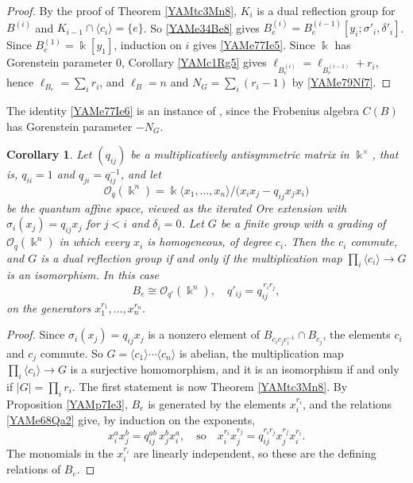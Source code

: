 \documentclass[reqno]{amsart}
\numberwithin{equation}{section}
\newtheorem{corollary}[equation]{Corollary}
\theoremstyle{definition}
\theoremstyle{remark}
\theoremstyle{plain}
\newcommand{\kk}{\Bbbk}
\begin{document}
\begin{proof}
By the proof of Theorem \ref{YAMtc3Mn8}, $K_i$ is a dual reflection group for $B^{(i)}$ and $K_{i-1}\cap\langle c_i\rangle=\{e\}$. So \eqref{YAMe34Be8} gives $B^{(i)}_e=B^{(i-1)}_e[y_i;\sigma'_i,\delta'_i]$. Since $B^{(1)}_e=\kk[y_1]$, induction on $i$ gives \eqref{YAMe77Ie5}. Since $\kk$ has Gorenstein parameter $0$, Corollary \ref{YAMc1Rg5} gives $\ell_{B^{(i)}_e}=\ell_{B^{(i-1)}_e}+r_i$, hence $\ell_{B_e}=\sum_ir_i$, and $\ell_B=n$ and $N_G=\sum_i(r_i-1)$ by \eqref{YAMe79Nf7}.
\end{proof}

The identity \eqref{YAMe77Ie6} is an instance of \cite[Lemma 3.4(3)]{KKZ}, since the Frobenius algebra $C(B)$ has Gorenstein parameter $-N_G$.

\begin{corollary}\label{YAMc7Qa1}
Let $(q_{ij})$ be a multiplicatively antisymmetric matrix in $\kk^\times$, that is, $q_{ii}=1$ and $q_{ji}=q_{ij}^{-1}$, and let
\begin{equation}\label{YAMe68Qa2}
\mathcal O_q(\kk^n)=\kk\langle x_1,\dots,x_n\rangle/\big(x_ix_j-q_{ij}x_jx_i\big)
\end{equation}
be the quantum affine space, viewed as the iterated Ore extension with $\sigma_i(x_j)=q_{ij}x_j$ for $j<i$ and $\delta_i=0$. Let $G$ be a finite group with a grading of $\mathcal O_q(\kk^n)$ in which every $x_i$ is homogeneous, of degree $c_i$. Then the $c_i$ commute, and $G$ is a dual reflection group if and only if the multiplication map $\prod_i\langle c_i\rangle\to G$ is an isomorphism. In this case
\[
B_e\cong\mathcal O_{q'}(\kk^n),\quad q'_{ij}=q_{ij}^{\,r_ir_j},
\]
on the generators $x_1^{r_1},\dots,x_n^{r_n}$.
\end{corollary}

\begin{proof}
Since $\sigma_i(x_j)=q_{ij}x_j$ is a nonzero element of $B_{c_ic_jc_i^{-1}}\cap B_{c_j}$, the elements $c_i$ and $c_j$ commute. So $G=\langle c_1\rangle\cdots\langle c_n\rangle$ is abelian, the multiplication map $\prod_i\langle c_i\rangle\to G$ is a surjective homomorphism, and it is an isomorphism if and only if $|G|=\prod_ir_i$. The first statement is now Theorem \ref{YAMtc3Mn8}. By Proposition \ref{YAMp7Ie3}, $B_e$ is generated by the elements $x_i^{r_i}$, and the relations \eqref{YAMe68Qa2} give, by induction on the exponents,
\[
x_i^ax_j^b=q_{ij}^{ab}\,x_j^bx_i^a,\quad\text{so}\quad x_i^{r_i}x_j^{r_j}=q_{ij}^{r_ir_j}x_j^{r_j}x_i^{r_i}.
\]
The monomials in the $x_i^{r_i}$ are linearly independent, so these are the defining relations of $B_e$.
\end{proof}
\end{document}
